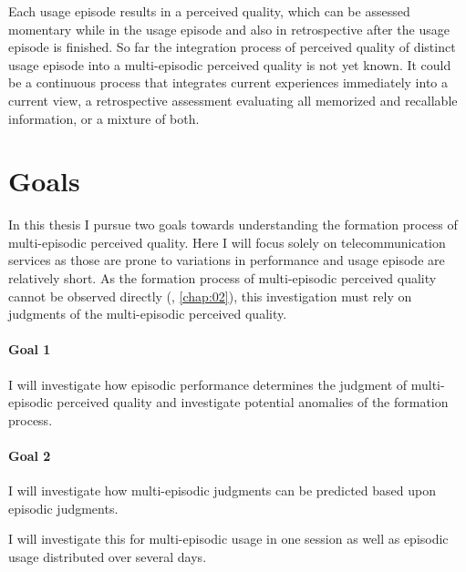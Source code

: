 Each usage episode results in a perceived quality, which can be assessed momentary while in the usage episode and also in retrospective after the usage episode is finished.
So far the integration process of perceived quality of distinct usage episode into a multi-episodic perceived quality is not yet known.
It could be a continuous process that integrates current experiences immediately into a current view, a retrospective assessment evaluating all memorized and recallable information, or a mixture of both.

\section{Goals}
In this thesis I pursue two goals towards understanding the formation process of multi-episodic perceived quality.
Here I will focus solely on telecommunication services as those are prone to variations in performance and usage episode are relatively short.
As the formation process of multi-episodic perceived quality cannot be observed directly (\cf, \autoref{chap:02}), this investigation must rely on judgments of the multi-episodic perceived quality.

\paragraph*{Goal 1}
I will investigate how episodic performance determines the judgment of multi-episodic perceived quality and investigate potential anomalies of the formation process.

\paragraph*{Goal 2}
I will investigate how multi-episodic judgments can be predicted based upon episodic judgments.

I will investigate this for multi-episodic usage in one session as well as episodic usage distributed over several days.

